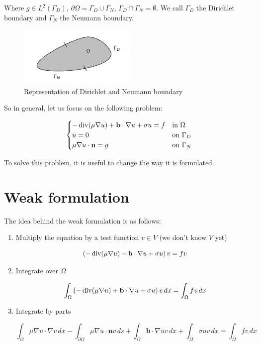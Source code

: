 Where $g \in L^2(\Gamma_D)$, $\partial \Omega = \Gamma_D \cup \Gamma_N$, $\Gamma_D \cap \Gamma_N = \emptyset$. We call 
$\Gamma_D$ the Dirichlet boundary and $\Gamma_N$ the Neumann boundary.

\begin{figure}[H]
    \centering
    \includegraphics[width=0.5\textwidth]{figures/dirich_neum_bound.png}
    \caption{Representation of Dirichlet and Neumann boundary}
    \label{fig:dirich_neum_bound}
\end{figure}

So in general, let us focus on the following problem:

\begin{equation}
    \begin{cases}
        -\operatorname{div}(\mu \nabla u) + \mathbf{b} \cdot \nabla u + \sigma u = f & \text{in } \Omega \\
        u = 0 & \text{on } \Gamma_D \\
        \mu \nabla u \cdot \mathbf{n} = g & \text{on } \Gamma_N
    \end{cases}
\end{equation}

To solve this problem, it is useful to change the way it is formulated.


\section{Weak formulation}

The idea behind the weak formulation is as follows:

\begin{enumerate}
    \item Multiply the equation by a test function $v \in V$ (we don't know $V$ yet)
    
    $$\left( -\operatorname{div}(\mu \nabla u) + \mathbf{b} \cdot \nabla u + \sigma u \right) v = f v $$

    \item Integrate over $\Omega$
    
    $$\int_{\Omega} \left( -\operatorname{div}(\mu \nabla u) + \mathbf{b} \cdot \nabla u + \sigma u \right) v \, dx = \int_{\Omega} f v \, dx$$

    \item Integrate by parts
    
    $$\int_{\Omega} \mu \nabla u \cdot \nabla v \, dx - \int_{\partial \Omega} \mu \nabla u \cdot \mathbf{n} v \, ds + \int_{\Omega} \mathbf{b} \cdot \nabla u v \, dx + \int_{\Omega} \sigma u v \, dx = \int_{\Omega} f v \, dx$$
\end{enumerate}

